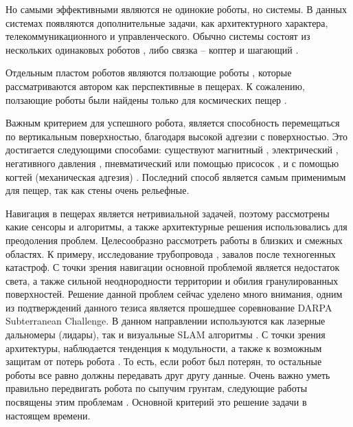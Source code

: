 Но самыми эффективными являются не одинокие роботы, но системы. В данных системах появляются дополнительные задачи, как архитектурного характера, телекоммуникационного и управленческого. Обычно системы состоят из нескольких одинаковых роботов \cite{Vaquero2018}, либо связка – коптер и шагающий \cite{Chen2010,Cantelli2013}.

Отдельным пластом роботов являются ползающие роботы \cite{Schmidt2013}, которые рассматриваются автором как перспективные в пещерах. К сожалению, ползающие роботы были найдены только для космических пещер \cite{Parness2017}. 

Важным критерием для успешного робота, является способность перемещаться по вертикальным поверхностью, благодаря высокой адгезии с поверхностью. Это достигается следующими способами: существуют магнитный \cite{Lee2012,tavakoliOmniClimberOmnidirectionalLight2012,Kotay1996,Xu2017}, электрический \cite{Li2017}, негативного давления \cite{Lee2012,tavakoliOmniClimberOmnidirectionalLight2012,Papachristos2019}, пневматический или помощью присосок \cite{Nagakubo1994,Tlale2012}, и с помощью когтей (механическая адгезия) \cite{Parness2017,Bretl2006,SangbaeKim2005,Sintov2011}. Последний способ является самым применимым для пещер, так как стены очень рельефные.

Навигация в пещерах является нетривиальной задачей, поэтому рассмотрены какие сенсоры и алгоритмы, а также архитектурные решения использовались для преодоления проблем. Целесообразно рассмотреть работы в близких и смежных областях. К примеру, исследование трубопровода \cite{Savin2017}, завалов после техногенных катастроф. С точки зрения навигации основной проблемой является недостаток света, а также сильной неоднородности территории и обилия гранулированных поверхностей. Решение данной проблем сейчас уделено много внимания, одним из подтверждений данного тезиса является прошедшее соревнование DARPA Subterranean Challenge. В данном направлении используются как лазерные дальномеры (лидары), так и визуальные SLAM алгоритмы \cite{Mascarich2018a,Dang2019a,Fairfield2006,Chhaniyara2012}. С точки зрения архитектуры, наблюдается тенденция к модульности, а также к возможным защитам от потерь робота \cite{Miller2019,weiStudyMineRescue2009}. То есть, если робот был потерян, то остальные роботы все равно должны передавать друг другу данные. Очень важно уметь правильно передвигать робота по сыпучим грунтам, следующие работы посвящены этим проблемам \cite{Tan2016,Savin2017,Chhaniyara2012,Tsounis2019, Li2009,Bjelonic2019,DeViragh2019,Buchanan2019}. Основной критерий это решение задачи в настоящем времени.

